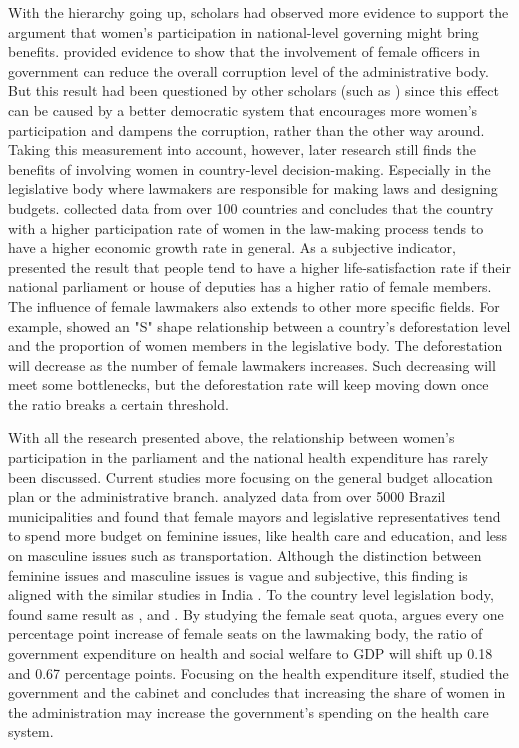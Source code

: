 With the hierarchy going up, scholars had observed more evidence to support the argument that women's participation in national-level governing might bring benefits. 
 provided evidence to show that the involvement of female officers in government can reduce the overall corruption level of the administrative body.
But this result had been questioned by other scholars (such as ) since this effect can be caused by a better democratic system that encourages more women's participation and dampens the corruption, rather than the other way around. 
Taking this measurement into account, however, later research still finds the benefits of involving women in country-level decision-making.
Especially in the legislative body where lawmakers are responsible for making laws and designing budgets.
 collected data from over 100 countries and concludes that the country with a higher participation rate of women in the law-making process tends to have a higher economic growth rate in general.
As a subjective indicator,  presented the result that people tend to have a higher life-satisfaction rate if their national parliament or house of deputies has a higher ratio of female members.  
The influence of female lawmakers also extends to other more specific fields.
For example,  showed an "S" shape relationship between a country's deforestation level and the proportion of women members in the legislative body. 
The deforestation will decrease as the number of female lawmakers increases.
Such decreasing will meet some bottlenecks, but the deforestation rate will keep moving down once the ratio breaks a certain threshold. 

With all the research presented above, the relationship between women's participation in the parliament and the national health expenditure has rarely been discussed. 
Current studies more focusing on the general budget allocation plan or the administrative branch.
 analyzed data from over 5000 Brazil municipalities and found that female mayors and legislative representatives tend to spend more budget on feminine issues, like health care and education, and less on masculine issues such as transportation.
Although the distinction between feminine issues and masculine issues is vague and subjective, this finding is aligned with the similar studies in India \cite{Irma2011}.
To the country level legislation body,  found same result as \citeauthor{Funk2018}, and \citeauthor{Irma2011}.
By studying the female seat quota, \citeauthor{Chen2010} argues every one percentage point increase of female seats on the lawmaking body, the ratio of government expenditure on health and social welfare to GDP will shift up 0.18 and 0.67 percentage points.
Focusing on the health expenditure itself,  studied the government and the cabinet and concludes that increasing the share of women in the administration may increase the government's spending on the health care system.

